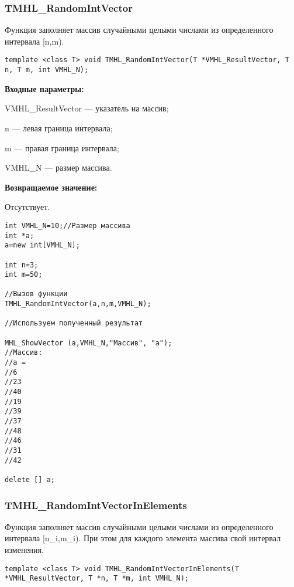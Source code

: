 \documentclass[a4paper,12pt]{article}
\begin{document}
\subsubsection{TMHL\_RandomIntVector}\label{TMHL_RandomIntVector}

Функция заполняет массив случайными целыми числами из определенного интервала [n,m).


\begin{lstlisting}[label=code_syntax_TMHL_RandomIntVector,caption=Синтаксис]
template <class T> void TMHL_RandomIntVector(T *VMHL_ResultVector, T n, T m, int VMHL_N);
\end{lstlisting}

\textbf{Входные параметры:}
 
VMHL\_ResultVector --- указатель на массив;
 
n --- левая граница интервала;
 
m --- правая граница интервала;
 
VMHL\_N --- размер массива.

\textbf{Возвращаемое значение:}

Отсутствует.


\begin{lstlisting}[label=code_use_TMHL_RandomIntVector,caption=Пример использования]
int VMHL_N=10;//Размер массива
int *a;
a=new int[VMHL_N];

int n=3;
int m=50;

//Вызов функции
TMHL_RandomIntVector(a,n,m,VMHL_N);

//Используем полученный результат

MHL_ShowVector (a,VMHL_N,"Массив", "a");
//Массив:
//a =
//6
//23
//40
//19
//39
//37
//48
//46
//31
//42

delete [] a;
\end{lstlisting}

\subsubsection{TMHL\_RandomIntVectorInElements}\label{TMHL_RandomIntVectorInElements}

Функция заполняет массив случайными целыми  числами из определенного интервала [n\_i,m\_i). При этом для каждого элемента массива свой интервал изменения.


\begin{lstlisting}[label=code_syntax_TMHL_RandomIntVectorInElements,caption=Синтаксис]
template <class T> void TMHL_RandomIntVectorInElements(T *VMHL_ResultVector, T *n, T *m, int VMHL_N);
\end{lstlisting}
\end{document}
